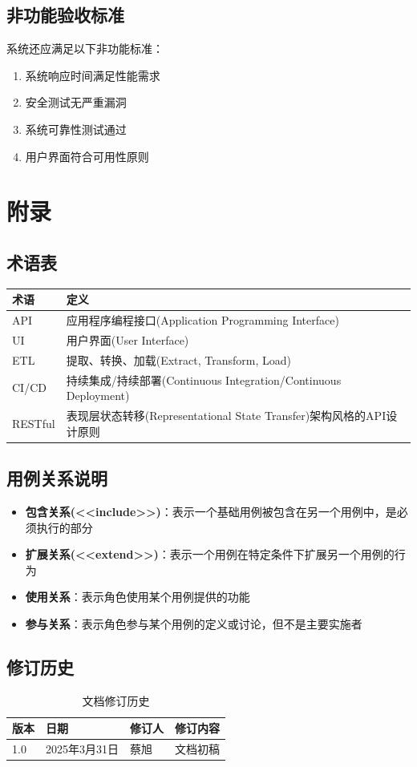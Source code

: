 \documentclass[a4paper,12pt]{article}
\begin{document}
\subsection{非功能验收标准}

系统还应满足以下非功能标准：

\begin{enumerate}
  \item 系统响应时间满足性能需求
  \item 安全测试无严重漏洞
  \item 系统可靠性测试通过
  \item 用户界面符合可用性原则
\end{enumerate}

\section{附录}

\subsection{术语表}

\begin{longtable}{|p{3cm}|p{12cm}|}
\hline
\textbf{术语} & \textbf{定义} \\
\hline
\endhead
API & 应用程序编程接口(Application Programming Interface) \\
\hline
UI & 用户界面(User Interface) \\
\hline
ETL & 提取、转换、加载(Extract, Transform, Load) \\
\hline
CI/CD & 持续集成/持续部署(Continuous Integration/Continuous Deployment) \\
\hline
RESTful & 表现层状态转移(Representational State Transfer)架构风格的API设计原则 \\
\hline
\end{longtable}

\subsection{用例关系说明}

\begin{itemize}
  \item \textbf{包含关系(<<include>>)}：表示一个基础用例被包含在另一个用例中，是必须执行的部分
  \item \textbf{扩展关系(<<extend>>)}：表示一个用例在特定条件下扩展另一个用例的行为
  \item \textbf{使用关系}：表示角色使用某个用例提供的功能
  \item \textbf{参与关系}：表示角色参与某个用例的定义或讨论，但不是主要实施者
\end{itemize}

\subsection{修订历史}

\begin{table}[htbp]
\centering
\begin{tabular}{llll}
\toprule
\textbf{版本} & \textbf{日期} & \textbf{修订人} & \textbf{修订内容} \\
\midrule
1.0 & 2025年3月31日 & 蔡旭 & 文档初稿 \\
\bottomrule
\end{tabular}
\caption{文档修订历史}
\end{table}
\end{document}
